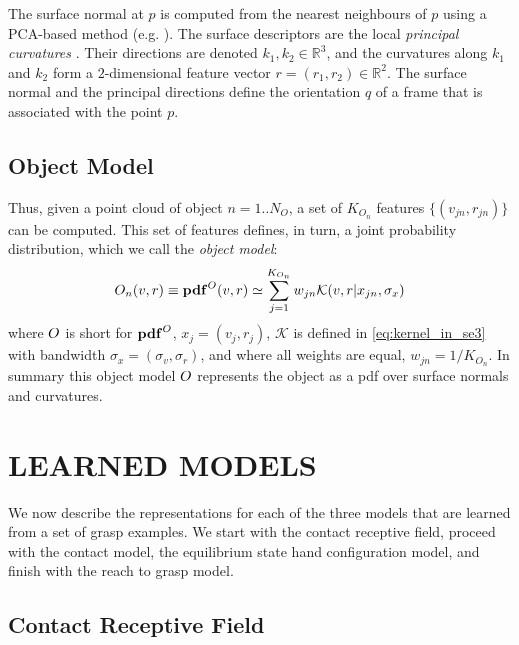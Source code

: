 The surface normal at $p$ is computed from the nearest neighbours of $p$ using a PCA-based method (e.g. \cite{kanatani2005statistical}). The surface descriptors are the local \emph{principal curvatures} \cite{spivak1979comprehensive}. Their directions are denoted $k_1, k_2 \in \mathbb R^3$, and the curvatures along $k_1$ and $k_2$ form a $2$-dimensional feature vector $r = (r_1, r_2) \in \mathbb R^2$. %
The surface normal and the principal directions define the orientation $q$ of a frame that is associated with the point $p$. 

\subsection{Object Model}
\label{sec:object_model}

Thus, given a point cloud of object $n = 1..N_O$, a set of $K_{O_n}$ features $\lbrace (v_{jn}, r_{jn}) \rbrace$ can be computed. This set of features defines, in turn, a joint probability distribution, which we call the \emph{object model}:
\begin{equation}
O_n(v, r) \equiv \mathbf{pdf}^O(v, r) \simeq \sum_{j=1}^{K_{O_n}} w_{jn} \mathcal{K}(v, r|{x_{jn}}, \sigma_{x})
\label{eq:om}
\end{equation}
where $O$ is short for $\mathbf{pdf}^O$, $x_j = (v_j, r_j)$,  $\mathcal{K}$ is defined in \eq\eqref{eq:kernel_in_se3} with bandwidth $\sigma_{x} = (\sigma_{v}, \sigma_{r})$, and where all weights are equal, $w_{jn} = 1/{K_{O_n}}$. In summary this object model $O$ represents the object as a pdf over surface normals and curvatures.

\section{LEARNED MODELS}

We now describe the representations for each of the three models that are learned from a set of grasp examples. We start with the contact receptive field, proceed with the contact model, the equilibrium state hand configuration model, and finish with the reach to grasp model.

\subsection{Contact Receptive Field}\label{sec:contact_recfield}

